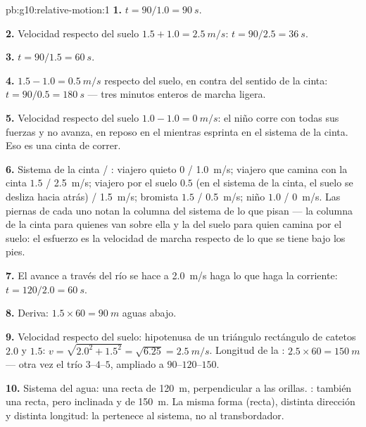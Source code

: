 \begin{solution}{pb:g10:relative-motion:1}
\textbf{1.} $t = 90/1.0 = \qty{90}{s}$.

\textbf{2.} Velocidad respecto del suelo $1.5 + 1.0 = \qty{2.5}{m/s}$:
$t = 90/2.5 = \qty{36}{s}$.

\textbf{3.} $t = 90/1.5 = \qty{60}{s}$.

\textbf{4.} $1.5 - 1.0 = \qty{0.5}{m/s}$ respecto del suelo, en contra
del sentido de la cinta: $t = 90/0.5 = \qty{180}{s}$ --- tres minutos
enteros de marcha ligera.

\textbf{5.} Velocidad respecto del suelo $1.0 - 1.0 = \qty{0}{m/s}$: el
niño corre con todas sus fuerzas y no avanza, en reposo en el  mientras esprinta en el sistema de la cinta. Eso es una cinta
de correr.

\textbf{6.} Sistema de la cinta / : viajero quieto $0$
/ \qty{1.0}{m/s}; viajero que camina con la cinta $1.5$ /
\qty{2.5}{m/s}; viajero por el suelo $0.5$ (en el sistema de la cinta,
el suelo se desliza hacia atrás) / \qty{1.5}{m/s}; bromista $1.5$ /
\qty{0.5}{m/s}; niño $1.0$ / \qty{0}{m/s}. Las piernas de cada uno notan
la columna del sistema de lo que pisan --- la columna de la cinta para
quienes van sobre ella y la del suelo para quien camina por el suelo: el
esfuerzo es la velocidad de marcha respecto de lo que se tiene bajo los
pies.

\textbf{7.} El avance a través del río se hace a \qty{2.0}{m/s} haga lo
que haga la corriente: $t = 120/2.0 = \qty{60}{s}$.

\textbf{8.} Deriva: $1.5 \times 60 = \qty{90}{m}$ aguas abajo.

\textbf{9.} Velocidad respecto del suelo: hipotenusa de un triángulo
rectángulo de catetos $2.0$ y $1.5$:
$v = \sqrt{2.0^2 + 1.5^2} = \sqrt{6.25} = \qty{2.5}{m/s}$. Longitud de
la : $2.5 \times 60 = \qty{150}{m}$ --- otra vez el trío
$3$--$4$--$5$, ampliado a $90$--$120$--$150$.

\textbf{10.} Sistema del agua: una recta de \qty{120}{m},
perpendicular a las orillas. : también una recta, pero
inclinada y de \qty{150}{m}. La misma forma (recta), distinta dirección
y distinta longitud: la  pertenece al sistema, no al
transbordador.


\end{solution}
